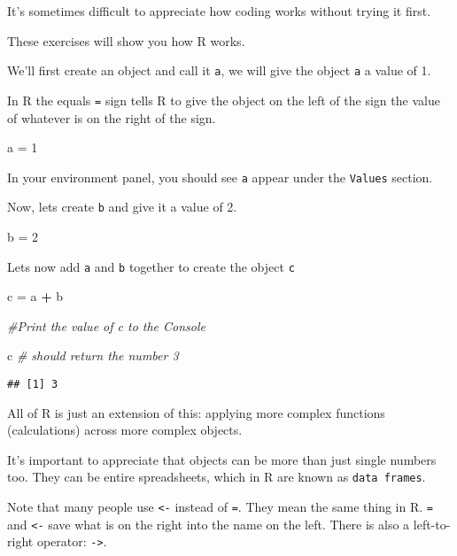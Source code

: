\documentclass[]{book}
\makeatletter
\newenvironment{Shaded}{\begin{snugshade}}{\end{snugshade}}
\newcommand{\DecValTok}[1]{\textcolor[rgb]{0.00,0.00,0.81}{#1}}
\newcommand{\StringTok}[1]{\textcolor[rgb]{0.31,0.60,0.02}{#1}}
\newcommand{\CommentTok}[1]{\textcolor[rgb]{0.56,0.35,0.01}{\textit{#1}}}
\newcommand{\OperatorTok}[1]{\textcolor[rgb]{0.81,0.36,0.00}{\textbf{#1}}}
\newcommand{\NormalTok}[1]{#1}
\newenvironment{kframe}{%
\medskip{}
\setlength{\fboxsep}{.8em}
 \def\at@end@of@kframe{}%
 \ifinner\ifhmode%
  \def\at@end@of@kframe{\end{minipage}}%
  \begin{minipage}{\columnwidth}%
 \fi\fi%
 \def\FrameCommand##1{\hskip\@totalleftmargin \hskip-\fboxsep
 \colorbox{shadecolor}{##1}\hskip-\fboxsep
     \hskip-\linewidth \hskip-\@totalleftmargin \hskip\columnwidth}%
 \MakeFramed {\advance\hsize-\width
   \@totalleftmargin\z@ \linewidth\hsize
   \@setminipage}}%
 {\par\unskip\endMakeFramed%
 \at@end@of@kframe}
\renewenvironment{Shaded}{\begin{kframe}}{\end{kframe}}
\theoremstyle{definition}
\theoremstyle{definition}
\theoremstyle{definition}
\theoremstyle{remark}
\makeatother
\begin{document}
It's sometimes difficult to appreciate how coding works without trying
it first.

These exercises will show you how R works.

We'll first create an object and call it \texttt{a}, we will give the
object \texttt{a} a value of 1.

In R the equals \texttt{=} sign tells R to give the object on the left
of the sign the value of whatever is on the right of the sign.

\begin{Shaded}
\begin{Highlighting}[]
\NormalTok{a =}\StringTok{ }\DecValTok{1}
\end{Highlighting}
\end{Shaded}

In your environment panel, you should see \texttt{a} appear under the
\texttt{Values} section.

Now, lets create \texttt{b} and give it a value of 2.

\begin{Shaded}
\begin{Highlighting}[]
\NormalTok{b =}\StringTok{ }\DecValTok{2}
\end{Highlighting}
\end{Shaded}

Lets now add \texttt{a} and \texttt{b} together to create the object
\texttt{c}

\begin{Shaded}
\begin{Highlighting}[]
\NormalTok{c =}\StringTok{ }\NormalTok{a }\OperatorTok{+}\StringTok{ }\NormalTok{b }

\CommentTok{#Print the value of c to the Console}

\NormalTok{c }\CommentTok{# should return the number 3}
\end{Highlighting}
\end{Shaded}

\begin{verbatim}
## [1] 3
\end{verbatim}

All of R is just an extension of this: applying more complex functions
(calculations) across more complex objects.

It's important to appreciate that objects can be more than just single
numbers too. They can be entire spreadsheets, which in R are known as
\texttt{data\ frames}.

Note that many people use \texttt{\textless{}-} instead of \texttt{=}.
They mean the same thing in R. \texttt{=} and \texttt{\textless{}-} save
what is on the right into the name on the left. There is also a
left-to-right operator: \texttt{-\textgreater{}}.
\end{document}
